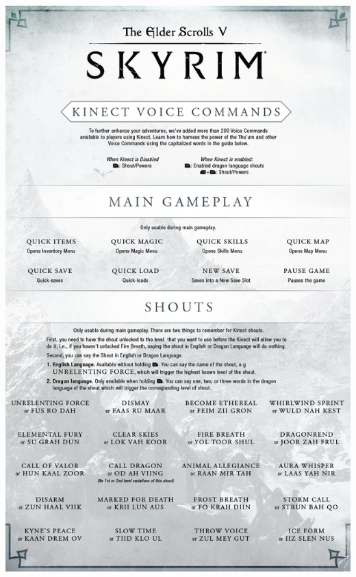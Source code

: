 \documentclass[12pt]{article}
\begin{document}
\includegraphics[scale=0.235]{skyrim-1.jpg}
\end{document}
